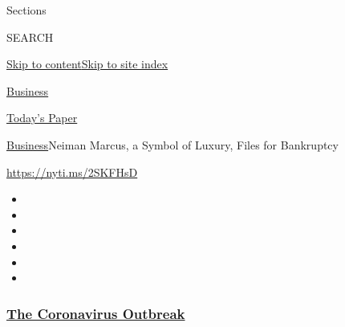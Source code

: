 Sections

SEARCH

\protect\hyperlink{site-content}{Skip to
content}\protect\hyperlink{site-index}{Skip to site index}

\href{https://www.nytimes3xbfgragh.onion/section/business}{Business}

\href{https://myaccount.nytimes3xbfgragh.onion/auth/login?response_type=cookie\&client_id=vi}{}

\href{https://www.nytimes3xbfgragh.onion/section/todayspaper}{Today's
Paper}

\href{/section/business}{Business}\textbar{}Neiman Marcus, a Symbol of
Luxury, Files for Bankruptcy

\url{https://nyti.ms/2SKFHsD}

\begin{itemize}
\item
\item
\item
\item
\item
\item
\end{itemize}

\hypertarget{the-coronavirus-outbreak}{%
\subsubsection{\texorpdfstring{\href{https://www.nytimes3xbfgragh.onion/news-event/coronavirus?name=styln-coronavirus-markets\&region=TOP_BANNER\&variant=undefined\&block=storyline_menu_recirc\&action=click\&pgtype=Article\&impression_id=85cc95a0-e38e-11ea-9e0e-81b7ab6c0278}{The
Coronavirus
Outbreak}}{The Coronavirus Outbreak}}\label{the-coronavirus-outbreak}}

